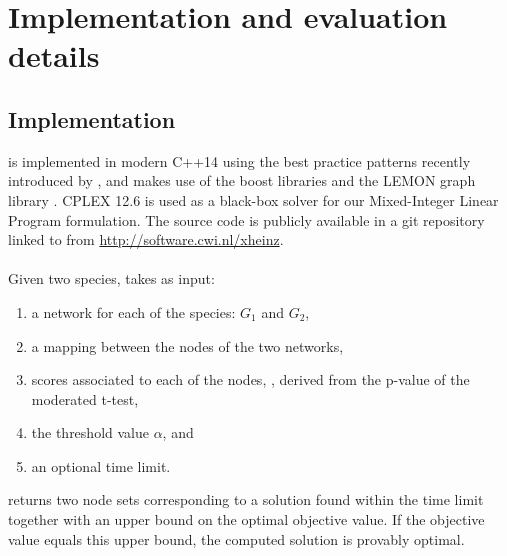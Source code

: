 \section{Implementation and evaluation details}
	\subsection{Implementation}

	\xheinz{} is implemented in modern C++14 using the best practice patterns recently introduced by \textcite{meyers2014effective}, and makes use of the boost libraries and the LEMON graph library \parencite{dezsHo2011lemon}.
		CPLEX 12.6 is used as a black-box solver for our Mixed-Integer Linear Program formulation.
		The source code is publicly available in a git repository linked to from \mbox{\url{http://software.cwi.nl/xheinz}}.

		\paragraph{}
		Given two species, \xheinz{} takes as input:
		\begin{enumerate}
			\item a network for each of the species: $G_1$ and $G_2$,
			\item a mapping between the nodes of the two networks,
			\item scores associated to each of the nodes, \eg, derived from the p-value of the moderated t-test,
			\item the threshold value $\alpha$, and
			\item an optional time limit.
		\end{enumerate}

		\xheinz{} returns two node sets corresponding to a solution found within the time limit together with an upper bound on the optimal objective value.
		If the objective value equals this upper bound, the computed solution is provably optimal.

